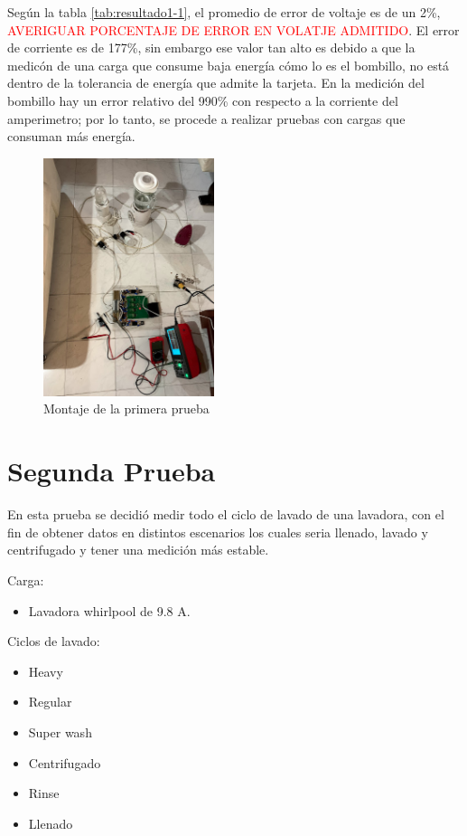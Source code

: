 Según la tabla \ref{tab:resultado1-1}, el promedio de error de voltaje es de un 2\%, \textcolor{red}{AVERIGUAR PORCENTAJE DE ERROR EN VOLATJE ADMITIDO}. El error de corriente es de 177\%, sin embargo ese valor tan alto es debido a que la medicón de una carga que consume baja energía cómo lo es el bombillo, no está dentro de la tolerancia de energía que admite la tarjeta. En la medición del bombillo hay un error relativo del 990\% con respecto a la corriente del amperimetro; por lo tanto, se procede a realizar pruebas con cargas que consuman más energía.
\begin{figure}[H]
  \begin{center}
      \includegraphics[width = 5cm]{4Resultados/montaje-1.png}
      \caption{ Montaje de la primera prueba } 
      \label{fig:montaje1}
 \end{center}
\end{figure}
  
\section{Segunda Prueba}
  
En esta prueba se decidió medir todo el ciclo de lavado de una lavadora, con el fin de obtener datos en distintos escenarios los cuales seria llenado, lavado y centrifugado y tener una medición más estable.

Carga:

\begin{itemize}
  \itemsep0em
  \item Lavadora whirlpool de 9.8 A.
\end{itemize}

Ciclos de lavado:

\begin{itemize}
  \itemsep0em
  \item Heavy
  \item Regular
  \item Super wash
  \item Centrifugado
  \item Rinse
  \item Llenado
\end{itemize}

